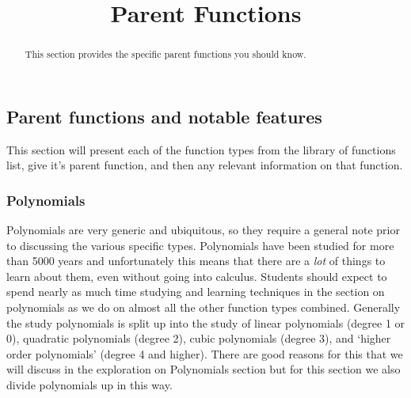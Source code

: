 \documentclass{ximeraXloud}
\title{Parent Functions}
\begin{document}
\begin{abstract}
    This section provides the specific parent functions you should know.
\end{abstract}
\maketitle





\subsection*{Parent functions and notable features}
    This section will present each of the function types from the library of functions list, give it's parent function, and then any relevant information on that function.

    \subsubsection*{Polynomials}
        Polynomials are very generic and ubiquitous, so they require a general note prior to discussing the various specific types. Polynomials have been studied for more than 5000 years and unfortunately this means that there are a \textit{lot} of things to learn about them, even without going into calculus. Students should expect to spend nearly as much time studying and learning techniques in the section on polynomials as we do on almost all the other function types combined. Generally the study polynomials is split up into the study of linear polynomials (degree 1 or 0), quadratic polynomials (degree 2), cubic polynomials (degree 3), and `higher order polynomials' (degree 4 and higher). There are good reasons for this that we will discuss in the exploration on Polynomials section but for this section we also divide polynomials up in this way.
        
\end{document}
